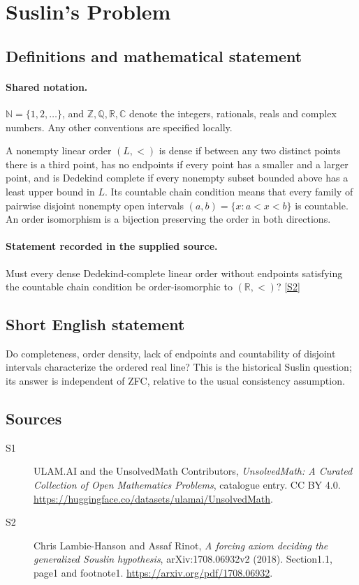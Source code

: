 \documentclass[11pt]{book}
\newcommand{\sref}[2]{\hyperlink{source:#1:#2}{[S#2]}}
\begin{document}
\section{Suslin's Problem}\label{statement}

\subsection{Definitions and mathematical statement}

\paragraph{Shared notation.}$\mathbb N=\{1,2,\ldots\}$, and $\mathbb Z,\mathbb Q,\mathbb R,\mathbb C$ denote the integers, rationals, reals and complex numbers. Any other conventions are specified locally.


A nonempty linear order $(L,<)$ is dense if between any two distinct points there is a third point, has no endpoints if every point has a smaller and a larger point, and is Dedekind complete if every nonempty subset bounded above has a least upper bound in $L$. Its countable chain condition means that every family of pairwise disjoint nonempty open intervals $(a,b)=\{x:a<x<b\}$ is countable. An order isomorphism is a bijection preserving the order in both directions.
\paragraph{Statement recorded in the supplied source.}
Must every dense Dedekind-complete linear order without endpoints satisfying the countable chain condition be order-isomorphic to $(\mathbb R,<)$? \sref{statement}{2}
\subsection{Short English statement}
Do completeness, order density, lack of endpoints and countability of disjoint intervals characterize the ordered real line? This is the historical Suslin question; its answer is independent of ZFC, relative to the usual consistency assumption.
\subsection{Sources}
\begin{description}
\item[\hypertarget{source:statement:1}{S1}] ULAM.AI and the UnsolvedMath Contributors, \emph{UnsolvedMath: A Curated Collection of Open Mathematics Problems}, catalogue entry. CC BY 4.0. \url{https://huggingface.co/datasets/ulamai/UnsolvedMath}.
\item[\hypertarget{source:statement:2}{S2}] Chris Lambie-Hanson and Assaf Rinot, \emph{A forcing axiom deciding the generalized Souslin hypothesis}, arXiv:1708.06932v2 (2018). Section1.1, page1 and footnote1. \url{https://arxiv.org/pdf/1708.06932}.
\end{description}
\label{end:statement}
\end{document}
